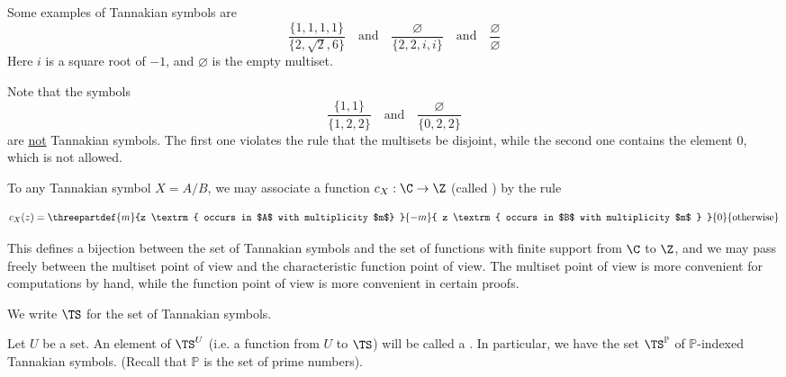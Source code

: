 \documentclass[a4paper]{article}
\begin{document}
\begin{example}
Some examples of Tannakian symbols are 
$$    \frac{   \{  1,1, 1, 1  \}   }{  \{  2, \sqrt{2}, 6  \}   } \quad \textrm{and} \quad   \frac{   \varnothing   }{  \{  2, 2, i, i  \}   }   \quad \textrm{and} \quad  \frac{  \varnothing  }{     \varnothing }    $$
Here $i$ is a square root of $-1$, and $\varnothing$ is the empty multiset.
\end{example}

\begin{example}
Note that the symbols 
$$    \frac{   \{  1, 1  \}   }{  \{  1, 2, 2  \}   } \quad \textrm{and} \quad   \frac{   \varnothing   }{  \{  0, 2, 2  \}   }      $$
are \underline{not} Tannakian symbols. The first one violates the rule that the multisets be disjoint, while the second one contains the element $0$, which is not allowed.
\end{example}

\begin{definition}
To any Tannakian symbol $X = A/B$, we may associate a function $c_X : \C \to \Z$ (called )  by the rule

$$  c_X(z) = \threepartdef { m } {z \textrm{ occurs in $A$ with multiplicity $m$} } {  -m }  { z \textrm{ occurs in $B$ with multiplicity $m$  } }  {0} {\textrm{otherwise}}   $$
\end{definition}
\begin{remark}

This defines a bijection between the set of Tannakian symbols and the set of functions with finite support from $\C$ to $\Z$, and we may pass freely between the multiset point of view and the characteristic function point of view. The multiset point of view is more convenient for computations by hand, while the function point of view is more convenient in certain proofs. 
\end{remark}

\begin{definition}
We write $\TS$ for the set of Tannakian symbols.
\end{definition}

\begin{definition}
Let $U$ be a set. An element of $\TS^U$ (i.e. a function from $U$ to $\TS$) will be called a . In particular, we have the set $\TS^{\mathbb{P}}$ of $\mathbb{P}$-indexed Tannakian symbols. (Recall that $\mathbb{P}$ is the set of prime numbers).
\end{definition}
\end{document}
